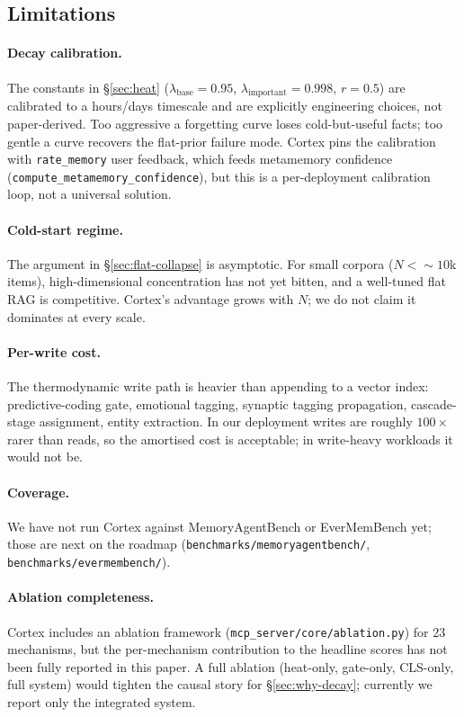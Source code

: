 \documentclass[11pt]{article}
\begin{document}
\subsection{Limitations}
\label{sec:limitations}

\paragraph{Decay calibration.}
The constants in \S\ref{sec:heat} ($\lambda_{\mathrm{base}} = 0.95$,
$\lambda_{\mathrm{important}} = 0.998$, $r = 0.5$) are calibrated
to a hours/days timescale and are explicitly engineering choices,
not paper-derived.  Too aggressive a forgetting curve loses
cold-but-useful facts; too gentle a curve recovers the flat-prior
failure mode.  Cortex pins the calibration with \texttt{rate\_memory}
user feedback, which feeds metamemory confidence
(\texttt{compute\_metamemory\_confidence}), but this is a
per-deployment calibration loop, not a universal solution.

\paragraph{Cold-start regime.}
The argument in \S\ref{sec:flat-collapse} is asymptotic.  For small
corpora ($N < {\sim}10$k items), high-dimensional concentration has
not yet bitten, and a well-tuned flat RAG is competitive.  Cortex's
advantage grows with $N$; we do not claim it dominates at every
scale.

\paragraph{Per-write cost.}
The thermodynamic write path is heavier than appending to a vector
index: predictive-coding gate, emotional tagging, synaptic tagging
propagation, cascade-stage assignment, entity extraction.  In our
deployment writes are roughly $100\times$ rarer than reads, so the
amortised cost is acceptable; in write-heavy workloads it would not
be.

\paragraph{Coverage.}
We have not run Cortex against MemoryAgentBench or EverMemBench
yet; those are next on the roadmap (\texttt{benchmarks/memoryagentbench/},
\texttt{benchmarks/evermembench/}).

\paragraph{Ablation completeness.}
Cortex includes an ablation framework (\texttt{mcp\_server/core/ablation.py})
for 23 mechanisms, but the per-mechanism contribution to the
headline scores has not been fully reported in this paper.  A full
ablation (heat-only, gate-only, CLS-only, full system) would
tighten the causal story for \S\ref{sec:why-decay}; currently we
report only the integrated system.
\end{document}
